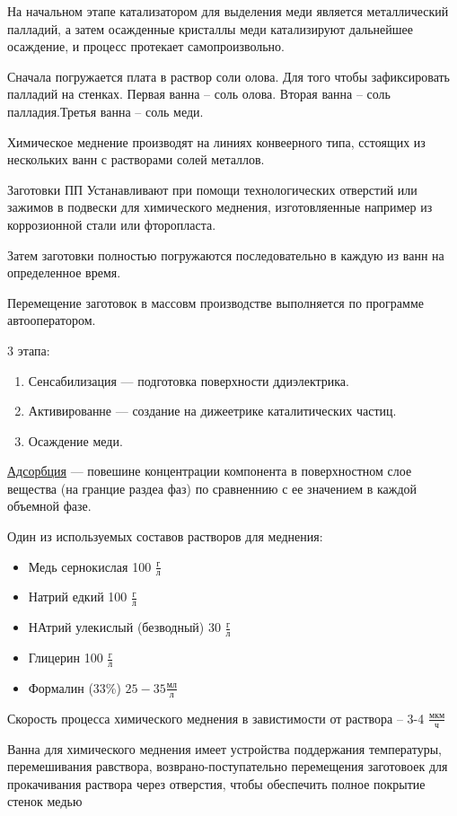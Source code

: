 \documentclass{article}
\begin{document}
На начальном этапе катализатором для выделения меди является металлический палладий, а затем осажденные кристаллы меди катализируют дальнейшее осаждение, и процесс протекает самопроизвольно.

Сначала погружается плата в раствор соли олова. Для того чтобы зафиксировать палладий на стенках. Первая ванна -- соль олова. Вторая ванна -- соль палладия.Третья ванна -- соль меди.

Химическое меднение производят на линиях конвеерного типа, сстоящих из нескольких ванн с растворами солей металлов.

Заготовки ПП Устанавливают при помощи технологических отверстий или зажимов в подвески для химического меднения, изготовляенные например из коррозионной стали или фторопласта.

Затем заготовки полностью погружаются последовательно в каждую из ванн на определенное время.

Перемещение заготовок в массовм производстве выполняется по программе автооператором.

3 этапа:
\begin{enumerate}
	\item Сенсабилизация --- подготовка поверхности ддиэлектрика.
	\item Активированне --- создание на дижеетрике каталитических частиц.
	\item Осаждение меди.
\end{enumerate}
\underline{Адсорбция} --- повешине концентрации компонента в поверхностном слое вещества (на гранцие раздеа фаз) по сравненнию с ее значением в каждой объемной фазе.

Один из используемых составов растворов для меднения:
\begin{itemize}
	\item Медь сернокислая 100 $ \frac{г}{л} $
	\item Натрий едкий 100 $ \frac{г}{л} $
	\item НАтрий улекислый (безводный) 30 $ \frac{г}{л} $
	\item Глицерин 100 $ \frac{г}{л} $
	\item Формалин (33\%) $25-35 \frac{мл}{л} $
\end{itemize}

Скорость процесса химического меднения в завистимости от раствора -- 3-4 $ \frac{мкм}{ч} $

Ванна для химического меднения имеет устройства поддержания температуры, перемешивания равствора, возврано-поступательно перемещения заготовоек для прокачивания раствора через отверстия, чтобы обеспечить полное покрытие стенок медью
\end{document}
